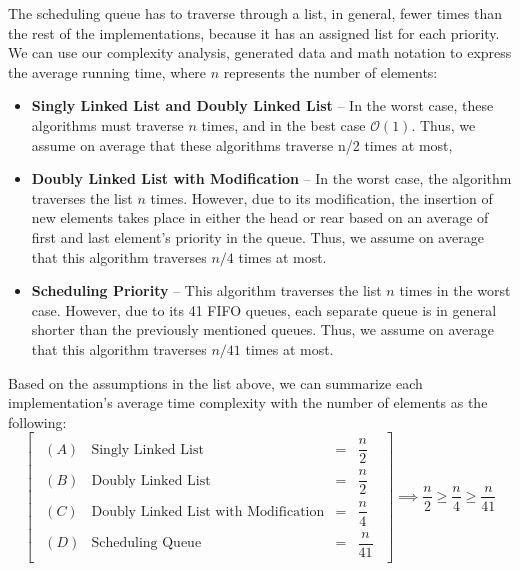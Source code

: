 \documentclass[a4paper,11pt]{kth-mag}
\newcommand*{\skippara}{\par\vspace{\baselineskip} \noindent}
\begin{document}
\skippara The scheduling queue has to traverse through a list, in general, fewer times than the rest of the implementations, because it has an assigned list for each priority.
We can use our complexity analysis, generated data and math notation to express the average running time, where $n$ represents the number of elements:
\begin{itemize}
    \item \textbf{Singly Linked List and Doubly Linked List} --
        In the worst case, these algorithms must traverse $n$ times, and in the best case $\mathcal{O}(1)$.
        Thus, we assume on average that these algorithms traverse n/2 times at most,
    \item \textbf{Doubly Linked List with Modification} --
        In the worst case, the algorithm traverses the list $n$ times.
        However, due to its modification, the insertion of new elements takes place in either the head or rear based on an average of first and last element's priority in the queue.
        Thus, we assume on average that this algorithm traverses $n/4$ times at most.
    \item \textbf{Scheduling Priority} --
        This algorithm traverses the list $n$ times in the worst case.
        However, due to its 41 FIFO queues, each separate queue is in general shorter than the previously mentioned queues.
        Thus, we assume on average that this algorithm traverses $n/41$ times at most.

\end{itemize}

\skippara Based on the assumptions in the list above, we can summarize each implementation's average time complexity with the number of elements as the following:
\begin{equation*}
    \begin{bmatrix*}
        \begin{array}{llll}
            (A) & \text{Singly Linked List} & = & \dfrac{n}{2} \\[3ex]
            (B) & \text{Doubly Linked List} & = & \dfrac{n}{2} \\[3ex]
            (C) & \text{Doubly Linked List with Modification} & = & \dfrac{n}{4} \\[3ex]
            (D) & \text{Scheduling Queue} & = & \dfrac{n}{41}
        \end{array}
    \end{bmatrix*}
    \implies \frac{n}{2} \ge \frac{n}{4} \ge \frac{n}{41}
\end{equation*}
\end{document}
